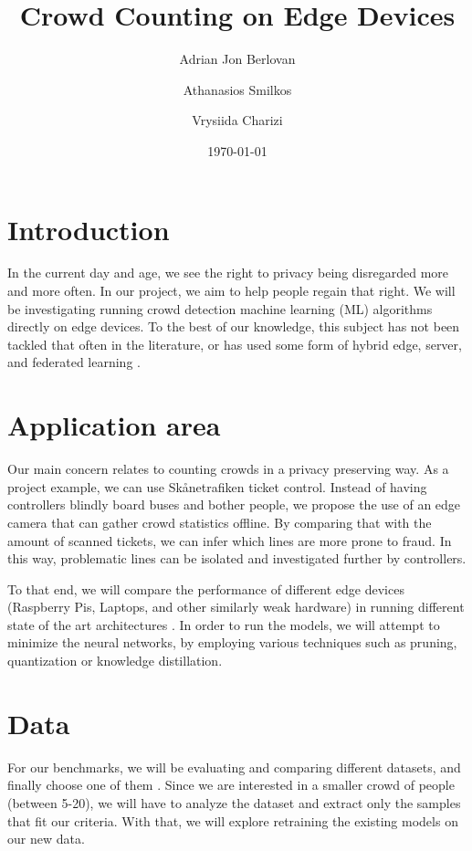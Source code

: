 \documentclass{article}
\title{Crowd Counting on Edge Devices}
\author{Adrian Jon Berlovan\and Athanasios Smilkos \and Vrysiida Charizi}
\date{\today}
\begin{document}
\maketitle

\clearpage

\section{Introduction}

In the current day and age, we see the right to privacy being disregarded more and more often. In our project, we aim to help people regain that right. We will be investigating running crowd detection machine learning (ML) algorithms directly on edge devices. To the best of our knowledge, this subject has not been tackled that often in the literature, or has used some form of hybrid edge, server, and federated learning \cite{UAV}.

\section{Application area}

Our main concern relates to counting crowds in a privacy preserving way. As a project example, we can use Skånetrafiken ticket control. Instead of having controllers blindly board buses and bother people, we propose the use of an edge camera that can gather crowd statistics offline. By comparing that with the amount of scanned tickets, we can infer which lines are more prone to fraud. In this way, problematic lines can be isolated and investigated further by controllers.

To that end, we will compare the performance of different edge devices (Raspberry Pis, Laptops, and other similarly weak hardware) in running different state of the art architectures \cite{RepSFNet} \cite{santos2025wireless} \cite{oneshot}. In order to run the models, we will attempt to minimize the neural networks, by employing various techniques such as pruning, quantization or knowledge distillation.

\section{Data}

For our benchmarks, we will be evaluating and comparing different datasets, and finally choose one of them \cite{CrowdHuman} \cite{COCO} \cite{KITTI}. Since we are interested in a smaller crowd of people (between 5-20), we will have to analyze the dataset and extract only the samples that fit our criteria. With that, we will explore retraining the existing models on our new data.
\end{document}
